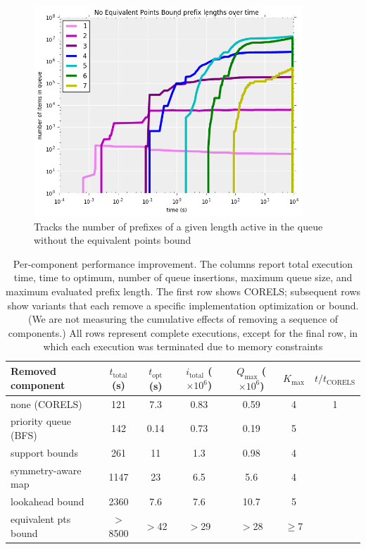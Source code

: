 \begin{figure}[t!]
\begin{center}
\includegraphics[width=0.9\textwidth]{figs/equivalent_prefixes.png}
\end{center}
\caption{Tracks the number of prefixes of a given length active in the queue without the equivalent points bound}
\label{fig:equivalent-prefixes}
\end{figure}

\begin{table}[t!]
\begin{tabular}{l | c | c | c | c | c | c} 
  Removed component & $t_\text{total}$ (s) & $t_\text{opt}$ (s) & $i_\text{total}$ ($\times 10^6$) & $Q_\text{max}$ ($\times 10^6$) & $K_\text{max}$ & $t/t_\text{CORELS}$ \\
\hline
none (CORELS) & 121 & 7.3 & 0.83 & 0.59 & 4 & 1 \\
priority queue (BFS) & 142 & 0.14 & 0.73 & 0.19 & 5 \\
support bounds & 261 & 11 & 1.3 & 0.98 & 4 \\
symmetry-aware map & 1147 & 23 & 6.5 & 5.6 & 4 \\
lookahead bound & 2360 & 7.6 & 7.6 & 10.7 & 5 \\
equivalent pts bound & $>$8500 & $>$42 & $>$29 & $>$28 & $\ge$7
\end{tabular}
\vspace{4mm}
\caption{Per-component performance improvement.
%
The columns report total execution time,
time to optimum, number of queue insertions,
maximum queue size, and maximum evaluated prefix length.
%
The first row shows CORELS; subsequent rows show variants
that each remove a specific implementation optimization or bound.
%
(We are not measuring the cumulative effects of removing a sequence of components.)
%
All rows represent complete executions, except for the final row,
in which each execution was terminated due to memory constraints
}
\label{tab:ablation}
\end{table}

